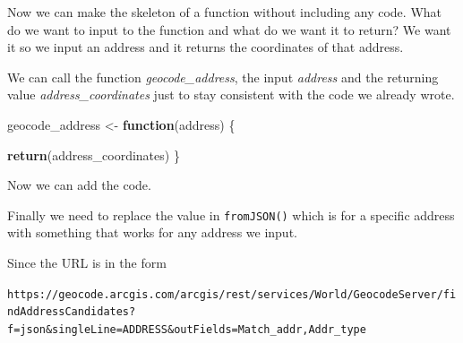 \documentclass[
  12pt,
]{book}
\newenvironment{Shaded}{\begin{snugshade}}{\end{snugshade}}
\newcommand{\ControlFlowTok}[1]{\textcolor[rgb]{0.27,0.27,0.27}{\textbf{#1}}}
\newcommand{\DecValTok}[1]{\textcolor[rgb]{0.06,0.06,0.06}{#1}}
\newcommand{\KeywordTok}[1]{\textcolor[rgb]{0.27,0.27,0.27}{\textbf{#1}}}
\newcommand{\NormalTok}[1]{#1}
\newcommand{\OperatorTok}[1]{\textcolor[rgb]{0.43,0.43,0.43}{\textbf{#1}}}
\newcommand{\StringTok}[1]{\textcolor[rgb]{0.5,0.5,0.5}{#1}}
\begin{document}
Now we can make the skeleton of a function without including any code. What do we want to input to the function and what do we want it to return? We want it so we input an address and it returns the coordinates of that address.

We can call the function \emph{geocode\_address}, the input \emph{address} and the returning value \emph{address\_coordinates} just to stay consistent with the code we already wrote.

\begin{Shaded}
\begin{Highlighting}[]
\NormalTok{geocode\_address \textless{}{-}}\StringTok{ }\ControlFlowTok{function}\NormalTok{(address) \{}
   
   \KeywordTok{return}\NormalTok{(address\_coordinates)}
\NormalTok{\}}
\end{Highlighting}
\end{Shaded}

Now we can add the code.

\begin{Shaded}
\end{Shaded}

Finally we need to replace the value in \texttt{fromJSON()} which is for a specific address with something that works for any address we input.

Since the URL is in the form

\texttt{https://geocode.arcgis.com/arcgis/rest/services/World/GeocodeServer/findAddressCandidates?f=json\&singleLine=ADDRESS\&outFields=Match\_addr,Addr\_type}
\end{document}
